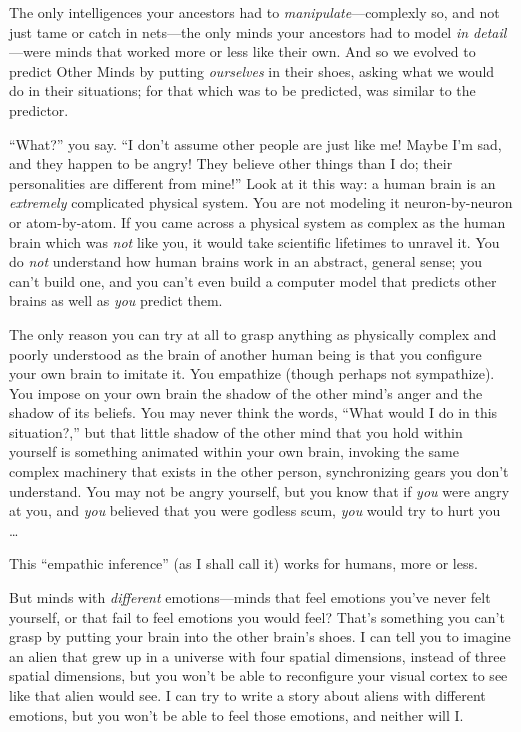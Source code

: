 {
 The only intelligences your ancestors had to
\textit{manipulate}{}---complexly so, and not just tame or catch in
nets---the only minds your ancestors had to model \textit{in
detail}{}---were minds that worked more or less like their own. And so
we evolved to predict Other Minds by putting \textit{ourselves} in
their shoes, asking what we would do in their situations; for that
which was to be predicted, was similar to the predictor.}

{
 ``What?'' you say.
``I don't assume other people are just
like me! Maybe I'm sad, and they happen to be angry!
They believe other things than I do; their personalities are different
from mine!'' Look at it this way: a human brain is an
\textit{extremely} complicated physical system. You are not modeling it
neuron-by-neuron or atom-by-atom. If you came across a physical system
as complex as the human brain which was \textit{not} like you, it would
take scientific lifetimes to unravel it. You do \textit{not} understand
how human brains work in an abstract, general sense; you
can't build one, and you can't even
build a computer model that predicts other brains as well as
\textit{you} predict them.}

{
 The only reason you can try at all to grasp anything as physically
complex and poorly understood as the brain of another human being is
that you configure your own brain to imitate it. You empathize (though
perhaps not sympathize). You impose on your own brain the shadow of the
other mind's anger and the shadow of its beliefs. You
may never think the words, ``What would I do in this
situation?,'' but that little shadow of the other
mind that you hold within yourself is something animated within your
own brain, invoking the same complex machinery that exists in the other
person, synchronizing gears you don't understand. You
may not be angry yourself, but you know that if \textit{you} were angry
at you, and \textit{you} believed that you were godless scum,
\textit{you} would try to hurt you \ldots}

{
 This ``empathic inference'' (as
I shall call it) works for humans, more or less.}

{
 But minds with \textit{different} emotions---minds that feel
emotions you've never felt yourself, or that fail to
feel emotions you would feel? That's something you
can't grasp by putting your brain into the other
brain's shoes. I can tell you to imagine an alien that
grew up in a universe with four spatial dimensions, instead of three
spatial dimensions, but you won't be able to
reconfigure your visual cortex to see like that alien would see. I can
try to write a story about aliens with different emotions, but you
won't be able to feel those emotions, and neither will
I.}


